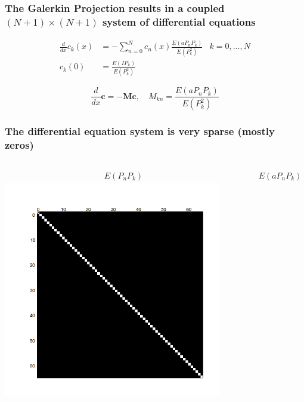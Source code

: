 \documentclass{beamer}
\begin{document}
\begin{frame}
 \frametitle{The Galerkin Projection results in a coupled $(N+1)\times (N+1)$ system of differential equations}
 \begin{align*}
     \frac{d}{dx}c_k(x) &= -\sum_{n=0}^N c_n(x) \frac{E(aP_nP_k)}{E(P_k^2)}
     & k=0,\dots,N\\
 c_k(0) &= \frac{E(IP_k)}{E(P_k^2)}
 \end{align*}

\[ \frac{d}{dx}\bm{c} = -\bm{M}\bm{c},\quad M_{kn}= \frac{E(aP_nP_k)}{E(P_k^2)}\]
 \end{frame}


\begin{frame}
 \frametitle{The differential equation system is very sparse (mostly zeros)}
 \begin{columns}
\begin{center}
    \begin{align*}
        E(P_nP_k)
    \end{align*}
  \includegraphics[width=0.9\textwidth]{binary_matrix1.png}
\end{center}
     \begin{center}
    \begin{align*}
        E(aP_nP_k)
    \end{align*}

\end{center}
\end{columns}
\end{frame}
\end{document}
